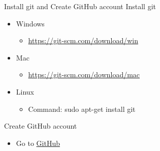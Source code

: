 \documentclass[11pt]{beamer}
\begin{document}
\begin{frame}[fragile]{Install git and Create GitHub account}
Install git
\begin{itemize}
	\item Windows
	\begin{itemize}
		\item \href{https://git-scm.com/download/win}{https://git-scm.com/download/win}
	\end{itemize}
	\item Mac
	\begin{itemize}
		\item \href{https://git-scm.com/download/mac}{https://git-scm.com/download/mac}
	\end{itemize}
	
	\item Linux
	\begin{itemize}
		\item Command: sudo apt-get install git
	\end{itemize}	
\end{itemize}
Create GitHub account
\begin{itemize}
	\item Go to \href{https://github.com/}{GitHub}
\end{itemize}
\end{frame}
\end{document}
